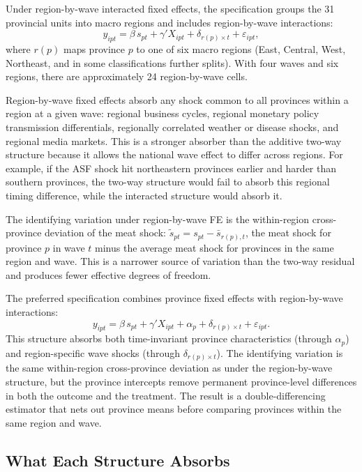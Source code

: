 Under region-by-wave interacted fixed effects, the specification
groups the 31 provincial units into
macro regions and includes region-by-wave interactions:
\[
  y_{ipt} = \beta\,s_{pt} + \gamma' X_{ipt}
    + \delta_{r(p) \times t} + \varepsilon_{ipt},
\]
where $r(p)$ maps province $p$ to one of six macro regions
(East, Central, West, Northeast, and in some classifications
further splits).
With four waves and six regions, there are approximately
24 region-by-wave cells.

Region-by-wave fixed effects absorb any shock common to all
provinces within a region at a given wave: regional business
cycles, regional monetary policy transmission differentials,
regionally correlated weather or disease shocks, and regional
media markets.
This is a stronger absorber than the additive two-way
structure because it allows the national wave effect to differ
across regions.
For example, if the ASF shock hit northeastern provinces
earlier and harder than southern provinces, the two-way
structure would fail to absorb this regional timing
difference, while the interacted structure would absorb it.

The identifying variation under region-by-wave FE is the
within-region cross-province deviation of the meat shock:
$\tilde{s}_{pt} = s_{pt} - \bar{s}_{r(p),t}$, the
meat shock for province $p$ in wave $t$ minus the average
meat shock for provinces in the same region and wave.
This is a narrower source of variation than the two-way
residual and produces fewer effective degrees of freedom.

The preferred specification combines province fixed effects
with region-by-wave interactions:
\[
  y_{ipt} = \beta\,s_{pt} + \gamma' X_{ipt}
    + \alpha_p + \delta_{r(p) \times t} + \varepsilon_{ipt}.
\]
This structure absorbs both time-invariant province
characteristics (through $\alpha_p$) and region-specific
wave shocks (through $\delta_{r(p) \times t}$).
The identifying variation is the same within-region
cross-province deviation as under the region-by-wave
structure, but the province intercepts remove permanent
province-level differences in both the outcome and the
treatment.
The result is a double-differencing estimator that nets out
province means before comparing provinces within the same
region and wave.

\subsection{What Each Structure Absorbs}

